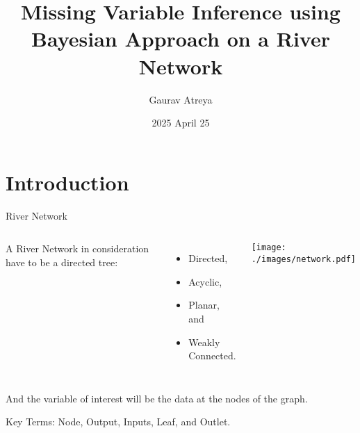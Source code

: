 \documentclass{beamer}
\title{Missing Variable Inference using Bayesian Approach on a River Network}
\author{Gaurav Atreya}
\institute{
 University of Cincinnati}
\date{2025 April 25}
\begin{document}
\begin{frame}
  \titlepage
\end{frame}

\section{Introduction}

\begin{frame}{River Network}
  \begin{columns}
    A River Network in consideration have to be a directed tree:
    \begin{itemize}
    \item Directed,
    \item Acyclic,
    \item Planar, and
    \item Weakly Connected.
    \end{itemize}

    \texttt{[image: ./images/network.pdf]}

  \end{columns}

  \vspace{0.5cm}
    
    And the variable of interest will be the data at the nodes of the graph.

    \vfill
    \pause
    
    {\color{blue}Key Terms}: Node, Output, Inputs, Leaf, and Outlet.
    
\end{frame}
\end{document}
